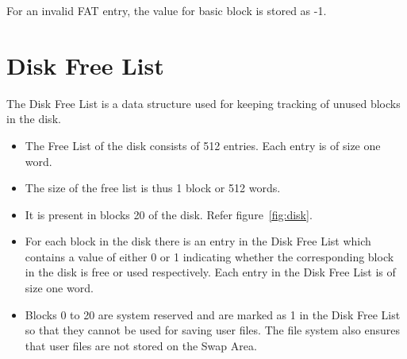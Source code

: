 \documentclass[11pt]{article}
\begin{document}
For an invalid FAT entry, the value for basic block is stored as -1.

\section{Disk Free List}
\label{lbl:disklst}
The Disk Free List is a data structure used for keeping tracking of unused blocks in the disk. 


\begin{itemize}
	\item  The Free List of the disk consists of 512 entries. Each entry is of size one word.
	\item  The size of the free list is thus 1 block or 512 words.
	\item  It is present in blocks 20 of the disk. Refer figure~\ref{fig:disk}. 
	\item  For each block in the disk there is an entry in the Disk Free List which contains a value of either 0 or 1 indicating whether the corresponding block in the disk is free or used respectively. Each entry in the Disk Free List is of size one word. 
	\item Blocks 0 to 20 are system reserved and are marked as 1 in the Disk Free List so that they cannot be used for saving user files. The file system also ensures that user files are not stored on the Swap Area.
\end{itemize}
\end{document}
